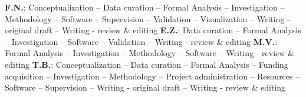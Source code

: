 \documentclass[12pt,preprint]{elsarticle}
\renewcommand{\ttdefault}{\sfdefault}
\begin{document}

\textbf{F.N.}:
Conceptualization --
Data curation --
Formal Analysis --
Investigation --
Methodology --
Software --
Supervision --
Validation --
Visualization --
Writing - original draft --
Writing - review \& editing
\textbf{E.Z.}:
Data curation --
Formal Analysis --
Investigation --
Software --
Validation --
Writing - review \& editing
\textbf{M.V.}:
Formal Analysis --
Investigation --
Methodology --
Software --
Writing - review \& editing
\textbf{T.B.}:
Conceptualization --
Data curation --
Formal Analysis --
Funding acquisition --
Investigation --
Methodology --
Project administration --
Resources --
Software --
Supervision --
Writing - original draft --
Writing - review \& editing

\renewcommand{\ttdefault}{\sfdefault}
%



\newpage

\makeatletter
\renewcommand \thesection{S\@arabic\c@section}
\renewcommand\thetable{S\@arabic\c@table}
\renewcommand \thefigure{S\@arabic\c@figure}
\makeatother

\renewcommand{\citenumfont}[1]{S#1}

\setcounter{equation}{0}
\setcounter{figure}{0}
\setcounter{table}{0}
\setcounter{section}{0}



\renewcommand{\ttdefault}{\sfdefault}

\newpage
\begin{small}
	\tableofcontents
\end{small}
\end{document}
